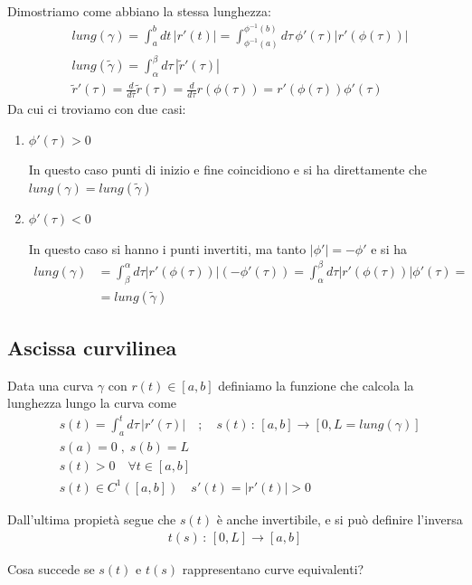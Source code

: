 Dimostriamo come abbiano la stessa lunghezza:
\begin{align}
&lung(\gamma)= \int_{a}^{b} dt \, |r'(t)|=\int_{\phi^{-1}(a)}^{\phi^{-1}(b)} d\tau \, \phi'(\tau)|r'(	\phi(\tau))| \\
&lung(\tilde{\gamma})= \int_{\alpha}^{\beta} d\tau \, |\tilde{r}'(\tau)| \\
& \tilde{r}'(\tau)= \frac{d}{d\tau} \tilde{r}(\tau) = \frac{d}{d\tau} r(\phi(\tau))=r'(\phi(\tau))
\phi'(\tau)
\end{align}
Da cui ci troviamo con due casi:
\begin{enumerate}
	\item $\phi'(\tau)>0$
	
	In questo caso punti di inizio e fine coincidiono e si ha direttamente che $lung(\gamma)=lung(\tilde{\gamma})$
	
	\item $\phi'(\tau)<0$
	
	In questo caso si hanno i punti invertiti, ma tanto $|\phi'|=-\phi'$ e si ha
	\begin{align}
	lung(\gamma){}&=\int_{\beta}^{\alpha} d\tau |r'(\phi(\tau))|(-\phi'(\tau))=\int_{\alpha}^{\beta} d\tau |r'(\phi(\tau))|\phi'(\tau)= \nonumber \\
	&=lung(\tilde{\gamma})
	\end{align}
\end{enumerate}

\subsection{Ascissa curvilinea}

Data una curva $\gamma$ con $r(t)\in[a,b]$ definiamo la funzione che calcola la lunghezza lungo la curva come
\begin{align}
{}&s(t)=\int_{a}^{t} d\tau \, |r'(\tau)| \quad ; \quad s(t) \, : \, [a,b] \longrightarrow [0,L=lung(\gamma)]\\
&s(a)=0 \; , \; s(b)=L \\
&s(t)>0 \quad \forall t \in [a,b]\\
&s(t)\in C^1([a,b]) \quad s'(t)=|r'(t)|>0
\end{align}

Dall'ultima propietà segue che $s(t)$ è anche invertibile, e si può definire l'inversa
\begin{align}
t(s) \, : \, [0,L]\longrightarrow[a,b]
\end{align}

Cosa succede se $s(t)$ e $t(s)$ rappresentano curve equivalenti?

